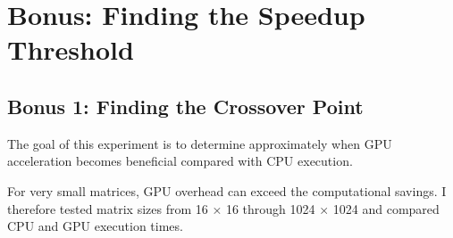 \documentclass[11pt]{article}
\begin{document}
    \section{Bonus: Finding the Speedup
Threshold}\label{bonus-finding-the-speedup-threshold}

\subsection{Bonus 1: Finding the Crossover
Point}\label{bonus-1-finding-the-crossover-point}

The goal of this experiment is to determine approximately when GPU
acceleration becomes beneficial compared with CPU execution.

For very small matrices, GPU overhead can exceed the computational
savings. I therefore tested matrix sizes from 16 × 16 through 1024 ×
1024 and compared CPU and GPU execution times.
\end{document}
